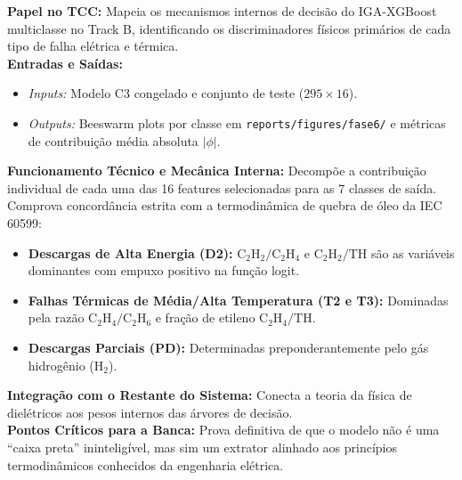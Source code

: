 \documentclass[10pt,a4paper]{article}
\begin{document}
\begin{filebox}
\textbf{Papel no TCC:} Mapeia os mecanismos internos de decisão do IGA-XGBoost multiclasse no Track B, identificando os discriminadores físicos primários de cada tipo de falha elétrica e térmica.\\
\textbf{Entradas e Saídas:}
\begin{itemize}[leftmargin=*,itemsep=1pt]
  \item \textit{Inputs:} Modelo C3 congelado e conjunto de teste ($295 \times 16$).
  \item \textit{Outputs:} Beeswarm plots por classe em \texttt{reports/figures/fase6/} e métricas de contribuição média absoluta $|\phi|$.
\end{itemize}
\textbf{Funcionamento Técnico e Mecânica Interna:} 
Decompõe a contribuição individual de cada uma das 16 features selecionadas para as 7 classes de saída. Comprova concordância estrita com a termodinâmica de quebra de óleo da IEC 60599:
\begin{itemize}[leftmargin=*,itemsep=0pt]
  \item \textbf{Descargas de Alta Energia (D2):} $\text{C}_2\text{H}_2/\text{C}_2\text{H}_4$ e $\text{C}_2\text{H}_2/\text{TH}$ são as variáveis dominantes com empuxo positivo na função logit.
  \item \textbf{Falhas Térmicas de Média/Alta Temperatura (T2 e T3):} Dominadas pela razão $\text{C}_2\text{H}_4/\text{C}_2\text{H}_6$ e fração de etileno $\text{C}_2\text{H}_4/\text{TH}$.
  \item \textbf{Descargas Parciais (PD):} Determinadas preponderantemente pelo gás hidrogênio ($\text{H}_2$).
\end{itemize}
\textbf{Integração com o Restante do Sistema:} Conecta a teoria da física de dielétricos aos pesos internos das árvores de decisão.\\
\textbf{Pontos Críticos para a Banca:} Prova definitiva de que o modelo não é uma ``caixa preta'' ininteligível, mas sim um extrator alinhado aos princípios termodinâmicos conhecidos da engenharia elétrica.
\end{filebox}
\end{document}
